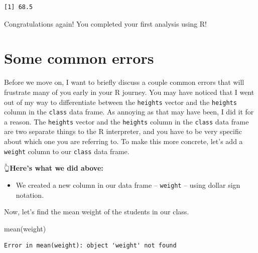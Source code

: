 \documentclass[
  letterpaper,
  DIV=11,
  numbers=noendperiod]{scrreprt}
\newenvironment{Shaded}{\begin{snugshade}}{\end{snugshade}}
\newcommand{\DecValTok}[1]{\textcolor[rgb]{0.68,0.00,0.00}{#1}}
\newcommand{\FunctionTok}[1]{\textcolor[rgb]{0.28,0.35,0.67}{#1}}
\newcommand{\NormalTok}[1]{\textcolor[rgb]{0.00,0.23,0.31}{#1}}
\newcommand{\OtherTok}[1]{\textcolor[rgb]{0.00,0.23,0.31}{#1}}
\newcommand{\SpecialCharTok}[1]{\textcolor[rgb]{0.37,0.37,0.37}{#1}}
\providecommand{\tightlist}{%
  \setlength{\itemsep}{0pt}\setlength{\parskip}{0pt}}\usepackage{longtable,booktabs,array}
\begin{document}
\begin{verbatim}
[1] 68.5
\end{verbatim}

Congratulations again! You completed your first analysis using R!

\section{Some common errors}\label{some-common-errors}

Before we move on, I want to briefly discuss a couple common errors that
will frustrate many of you early in your R journey. You may have noticed
that I went out of my way to differentiate between the \texttt{heights}
vector and the \texttt{heights} column in the \texttt{class} data frame.
As annoying as that may have been, I did it for a reason. The
\texttt{heights} vector and the \texttt{heights} column in the
\texttt{class} data frame are two separate things to the R interpreter,
and you have to be very specific about which one you are referring to.
To make this more concrete, let's add a \texttt{weight} column to our
\texttt{class} data frame.

\begin{Shaded}
\end{Shaded}

👆\textbf{Here's what we did above:}

\begin{itemize}
\tightlist
\item
  We created a new column in our data frame -- \texttt{weight} -- using
  dollar sign notation.
\end{itemize}

Now, let's find the mean weight of the students in our class.

\begin{Shaded}
\begin{Highlighting}[]
\FunctionTok{mean}\NormalTok{(weight)}
\end{Highlighting}
\end{Shaded}

\begin{verbatim}
Error in mean(weight): object 'weight' not found
\end{verbatim}
\end{document}
